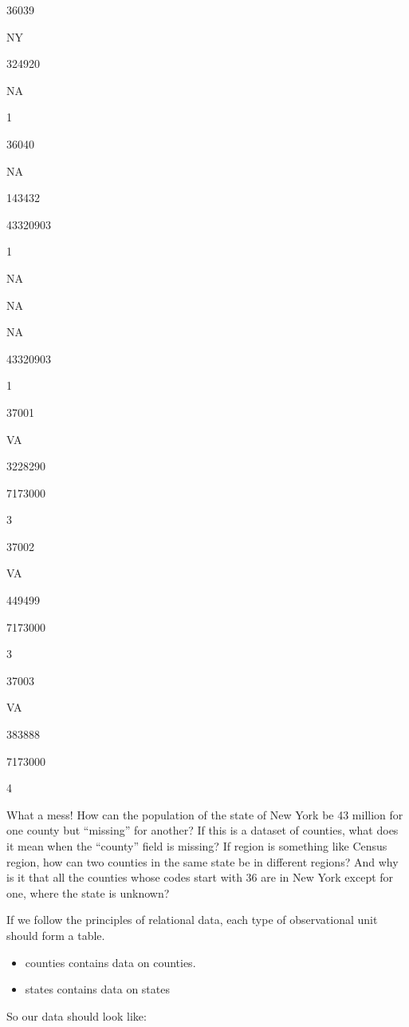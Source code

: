 \documentclass[]{book}
\providecommand{\tightlist}{%
  \setlength{\itemsep}{0pt}\setlength{\parskip}{0pt}}
\begin{document}
36039

NY

324920

NA

1

36040

NA

143432

43320903

1

NA

NA

NA

43320903

1

37001

VA

3228290

7173000

3

37002

VA

449499

7173000

3

37003

VA

383888

7173000

4

What a mess! How can the population of the state of New York be 43 million for one county but ``missing'' for another? If this is a dataset of counties, what does it mean when the ``county'' field is missing? If region is something like Census region, how can two counties in the same state be in different regions? And why is it that all the counties whose codes start with 36 are in New York except for one, where the state is unknown?

If we follow the principles of relational data, each type of observational unit should form a table.

\begin{itemize}
\tightlist
\item
  counties contains data on counties.
\item
  states contains data on states
\end{itemize}

So our data should look like:
\end{document}
